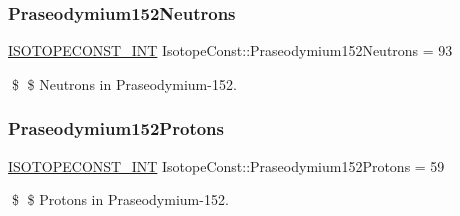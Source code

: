 \subsubsection{\texorpdfstring{Praseodymium152\+Neutrons}{Praseodymium152Neutrons}}
{\footnotesize\ttfamily \mbox{\hyperlink{group___isotope_const-_macros_ga5f18360b3e99483a35c32d789e62621c}{I\+S\+O\+T\+O\+P\+E\+C\+O\+N\+S\+T\+\_\+\+I\+NT}} Isotope\+Const\+::\+Praseodymium152\+Neutrons = 93}

\$ \$ Neutrons in Praseodymium-\/152. \mbox{\label{group___isotope_const-_praseodymium-_pr152_gaf8b433907e3bca82b1f12628fd10e715}} 
\subsubsection{\texorpdfstring{Praseodymium152\+Protons}{Praseodymium152Protons}}
{\footnotesize\ttfamily \mbox{\hyperlink{group___isotope_const-_macros_ga5f18360b3e99483a35c32d789e62621c}{I\+S\+O\+T\+O\+P\+E\+C\+O\+N\+S\+T\+\_\+\+I\+NT}} Isotope\+Const\+::\+Praseodymium152\+Protons = 59}

\$ \$ Protons in Praseodymium-\/152. 